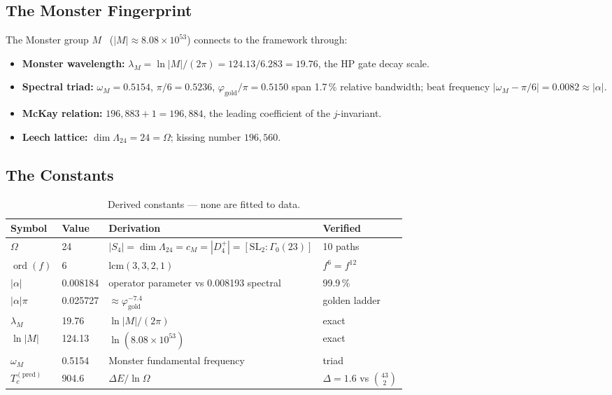 \documentclass[11pt,a4paper]{article}
\theoremstyle{plain}
\theoremstyle{remark}
\renewcommand{\Omega}{\varOmega}
\newcommand{\ord}{\operatorname{ord}}
\begin{document}
\subsection{The Monster Fingerprint}
\label{sec:monster}

The Monster group $M$~\cite{conway-norton1979}
($|M|\approx 8.08\times 10^{53}$) connects to the framework through:
\begin{itemize}[nosep]
  \item \textbf{Monster wavelength:}
    $\lambda_M=\ln|M|/(2\pi)=124.13/6.283=19.76$, the HP gate decay scale.
  \item \textbf{Spectral triad:}
    $\omega_M=0.5154$, $\pi/6=0.5236$, $\varphi_{\mathrm{gold}}/\pi=0.5150$
    span 1.7\,\% relative bandwidth; beat frequency
    $|\omega_M-\pi/6|=0.0082\approx|\alpha|$.
  \item \textbf{McKay relation:}
    $196{,}883+1=196{,}884$, the leading coefficient of the
    $j$-invariant.
  \item \textbf{Leech lattice:}
    $\dim\Lambda_{24}=24=\Omega$; kissing number $196{,}560$.
\end{itemize}

\subsection{The Constants}
\label{sec:constants}

\begin{table}[H]
\centering\small
\setlength{\tabcolsep}{5pt}
\begin{tabular}{@{}llll@{}}
\toprule
Symbol & Value & Derivation & Verified\\
\midrule
$\Omega$   & 24       & $|S_4|=\dim\Lambda_{24}=c_M=|D_4^+|=[\mathrm{SL}_2:\Gamma_0(23)]$ & 10 paths\\
$\ord(f)$ & 6 & $\mathrm{lcm}(3,3,2,1)$ & $f^6=f^{12}$\\
$|\alpha|$ & 0.008184 & operator parameter vs 0.008193 spectral & 99.9\,\%\\
$|\alpha|\pi$ & 0.025727 & $\approx\varphi_{\mathrm{gold}}^{-7.4}$ & golden ladder\\
$\lambda_M$ & 19.76 & $\ln|M|/(2\pi)$ & exact\\
$\ln|M|$ & 124.13 & $\ln(8.08\times 10^{53})$ & exact\\
$\omega_M$ & 0.5154 & Monster fundamental frequency & triad\\
$T_c^{(\mathrm{pred})}$ & 904.6 & $\Delta E/\ln\Omega$ & $\Delta=1.6$ vs $\binom{43}{2}$\\
\bottomrule
\end{tabular}
\caption{Derived constants --- none are fitted to data.}
\label{tab:constants}
\end{table}
\end{document}
